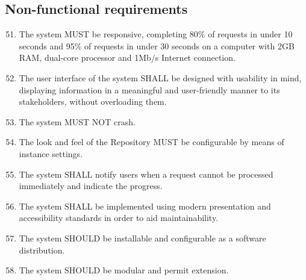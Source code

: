 \subsection{Non-functional requirements}
\label{nonFunctionalRequirements}
\begin{enumerate}[1]
\setcounter{enumi}{50}
\item The system MUST be responsive, completing 80\% of requests in under 10 seconds and 95\% of requests in under 30 seconds on a computer with 2GB RAM, dual-core processor and 1Mb/s Internet connection.

\item The user interface of the system  SHALL be designed with usability in mind, displaying information in a meaningful and user-friendly manner to its stakeholders, without overloading them.

\item The system MUST NOT crash.

\item The look and feel of the Repository MUST be configurable by means of instance settings.

\item The system SHALL notify users when a request cannot be processed immediately and indicate the progress.

\item The system SHALL be implemented using modern presentation and accessibility standards in order to aid maintainability.

\item The system SHOULD be installable and configurable as a software distribution.

\item The system SHOULD be modular and permit extension.
\end{enumerate}
